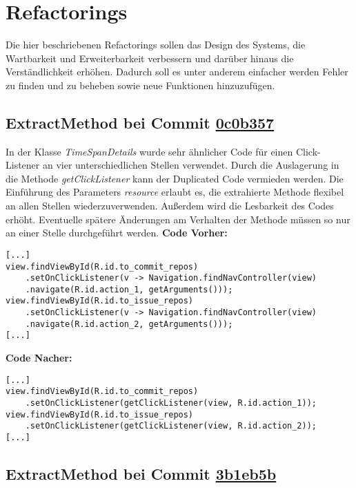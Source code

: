 \newpage
\section{Refactorings}
\label{sec:Refactorings}

Die hier beschriebenen Refactorings sollen das Design des Systems, die Wartbarkeit und Erweiterbarkeit verbessern und darüber hinaus die Verständlichkeit erhöhen.
Dadurch soll es unter anderem einfacher werden Fehler zu finden und zu beheben sowie neue Funktionen hinzuzufügen.


\subsection{ExtractMethod bei Commit \href{https://github.com/lukaspanni/OpenSourceStats/commit/0c0b357dee742575d8465ae26e64152bfecbf5ab} {0c0b357}}
\label{sec:ExtractMethod_TimeSpanDetails}

In der Klasse \textit{TimeSpanDetails} wurde sehr ähnlicher Code für einen Click-Listener an vier unterschiedlichen Stellen verwendet.
Durch die Auslagerung in die Methode \textit{getClickListener} kann der Duplicated Code vermieden werden.
Die Einführung des Parameters \textit{resource} erlaubt es, die extrahierte Methode flexibel an allen Stellen wiederzuverwenden.
Außerdem wird die Lesbarkeit des Codes erhöht.
Eventuelle spätere Änderungen am Verhalten der Methode müssen so nur an einer Stelle durchgeführt werden.
\newline
\textbf{Code Vorher:} 
\begin{lstlisting}[breaklines=false]
[...]
view.findViewById(R.id.to_commit_repos)
    .setOnClickListener(v -> Navigation.findNavController(view)
    .navigate(R.id.action_1, getArguments()));
view.findViewById(R.id.to_issue_repos)
    .setOnClickListener(v -> Navigation.findNavController(view)
    .navigate(R.id.action_2, getArguments()));
[...]
\end{lstlisting}
\textbf{Code Nacher:} 
\begin{lstlisting}[breaklines=false]
[...]
view.findViewById(R.id.to_commit_repos)
    .setOnClickListener(getClickListener(view, R.id.action_1));
view.findViewById(R.id.to_issue_repos)
    .setOnClickListener(getClickListener(view, R.id.action_2));
[...]
\end{lstlisting}

\newpage
\subsection{ExtractMethod bei Commit \href{https://github.com/lukaspanni/OpenSourceStats/commit/3b1eb5bf6750c3ccaeb05962ec8a8ae743adbf2c} {3b1eb5b}}
\label{sec:ExtractMethod_Repository}

